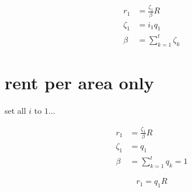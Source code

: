 \documentclass[11pt]{article}
\begin{document}
    \begin{align}
        r_1  &= \frac{\zeta_1}{\beta} R \\
        \zeta_1 &= i_1 q_1 \\
        \beta  &= \sum_{k=1}^{t} \zeta_k
    \end{align}

    
    \section{rent per area only}

    set all $i$ to $1$...

    \begin{align}
        r_1  &= \frac{\zeta_1}{\beta} R \\
        \zeta_1 &= q_1 \\
        \beta  &= \sum_{k=1}^{t} q_k = 1
    \end{align}

    \rightarrow

    \begin{equation}
        r_1  = q_1 R
    \end{equation}





    
    
\end{document}

